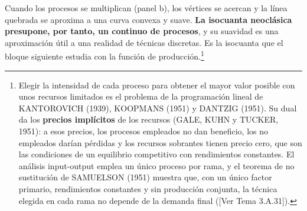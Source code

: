\documentclass[10pt,a4paper]{article}
\newcommand{\authorfont}[1]{{\fontfamily{EBGaramond-TLF}\selectfont #1}}
\begin{document}
Cuando los procesos se multiplican (panel b), los vértices se acercan y la línea quebrada se aproxima a una curva convexa y suave. \textbf{La isocuanta neoclásica presupone, por tanto, un continuo de procesos}, y su suavidad es una aproximación útil a una realidad de técnicas discretas. Es la isocuanta que el bloque siguiente estudia con la función de producción.\footnote{%
    Elegir la intensidad de cada proceso para obtener el mayor valor posible con unos recursos limitados es el problema de la programación lineal de KANTOROVICH (1939), KOOPMANS (1951) y DANTZIG (1951). Su dual da los \textbf{precios implícitos} de los recursos (GALE, KUHN y TUCKER, 1951): a esos precios, los procesos empleados no dan beneficio, los no empleados darían pérdidas y los recursos sobrantes tienen precio cero, que son las condiciones de un equilibrio competitivo con rendimientos constantes. El análisis input-output emplea un único proceso por rama, y el teorema de no sustitución de SAMUELSON (1951) muestra que, con un único factor primario, rendimientos constantes y sin producción conjunta, la técnica elegida en cada rama no depende de la demanda final ([\authorfont{Ver Tema 3.A.31}]).
}














\clearpage
\end{document}
